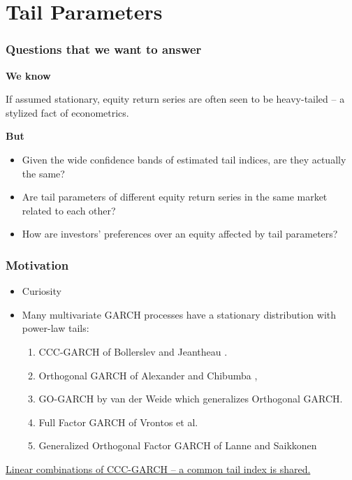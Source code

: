\documentclass{beamer}
\begin{document}
\section{Tail Parameters}
\begin{frame}
  \frametitle{Questions that we want to answer}
  \textcolor[HTML]{990033}{\bf We know}

  If assumed stationary, equity return series are often seen to be
  heavy-tailed -- a stylized fact of econometrics.
  
  \textcolor[HTML]{990033}{\bf But}
  \begin{itemize}
    \item Given the wide confidence bands of estimated tail indices,
      are they actually the same?
    \item Are tail parameters of different equity return series in the same
      market related to each other?
    \item How are investors' preferences over an equity affected by
      tail parameters?
  \end{itemize}
\end{frame}

\begin{frame}
  \frametitle{Motivation}
  \begin{itemize}
  \item Curiosity
    \item Many multivariate GARCH processes have a stationary
      distribution with power-law tails:
      \begin{enumerate}
        \item CCC-GARCH of Bollerslev \cite{bollerslev:1990} and
          Jeantheau \cite{jeantheau:1998}.
        \item Orthogonal GARCH of
          Alexander and Chibumba \cite{alexander:chibumba:1996},
        \item GO-GARCH by van der Weide \cite{Weide2002} which
          generalizes Orthogonal GARCH.
        \item Full Factor GARCH of Vrontos et
          al. \cite{vrontos2003full}
        \item Generalized Orthogonal Factor GARCH of Lanne and
          Saikkonen  \cite{lanne2007modelling}
      \end{enumerate}
  \end{itemize}
  \underline{Linear combinations of CCC-GARCH -- a common tail index is shared.}
\end{frame}
\end{document}
